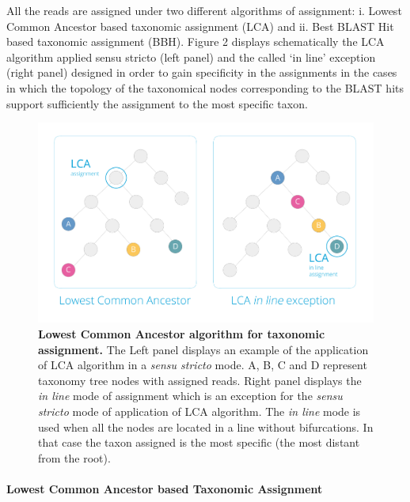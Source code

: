 \documentclass[fontsize=8pt,paper=a4,pagesize,abstracton]{scrartcl}
\makeatletter
\def\maxwidth{\ifdim\Gin@nat@width>\linewidth\linewidth
\else\Gin@nat@width\fi}
\let\Oldincludegraphics\includegraphics
\renewcommand{\includegraphics}[1]{\Oldincludegraphics[width=\maxwidth]{#1}}
\makeatother
\begin{document}
All the reads are assigned under two different algorithms of assignment:
i. Lowest Common Ancestor based taxonomic assignment (LCA) and ii. Best
BLAST Hit based taxonomic assignment (BBH). Figure 2 displays
schematically the LCA algorithm applied sensu stricto (left panel) and
the called `in line' exception (right panel) designed in order to gain
specificity in the assignments in the cases in which the topology of the
taxonomical nodes corresponding to the BLAST hits support sufficiently
the assignment to the most specific taxon.

\begin{figure}[htbp]
\centering
\includegraphics{Figure-2.jpg}
\caption{\textbf{Lowest Common Ancestor algorithm for taxonomic
assignment.} The Left panel displays an example of the application of
LCA algorithm in a \emph{sensu stricto} mode. A, B, C and D represent
taxonomy tree nodes with assigned reads. Right panel displays the
\emph{in line} mode of assignment which is an exception for the
\emph{sensu stricto} mode of application of LCA algorithm. The \emph{in
line} mode is used when all the nodes are located in a line without
bifurcations. In that case the taxon assigned is the most specific (the
most distant from the root).}
\end{figure}

\paragraph{Lowest Common Ancestor based Taxonomic
Assignment}\label{lowest-common-ancestor-based-taxonomic-assignment}
\end{document}
